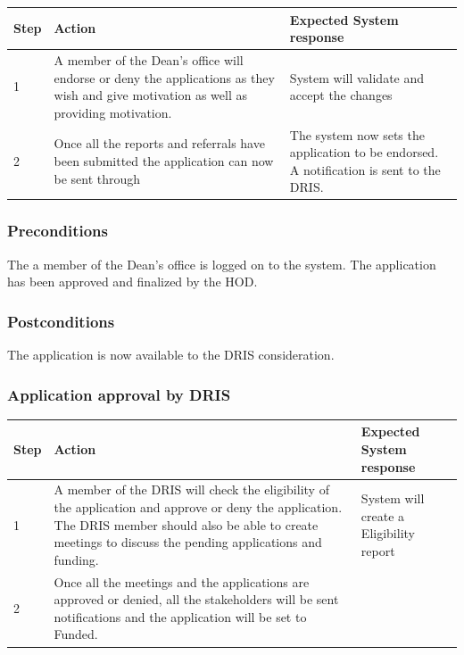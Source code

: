 \documentclass[12pt]{article}
\begin{document}
\begin{center}
\begin{tabular}{|l|p{6cm}|p{8cm}|}
\hline
Step & Action & Expected System response \\
\hline
1 & A member of the Dean's office will endorse or deny the applications as they wish and give motivation as well as providing motivation.  & System will validate and accept the changes\\
\hline
2 & Once all the reports and referrals have been submitted the application can now be sent through  & The system now sets the application to be endorsed. A notification is sent to the DRIS. \\
\hline
\end{tabular}
\end{center}

\subsubsection*{Preconditions}
The a member of the Dean's office is logged on to the system. The application has been approved and finalized by the HOD.

\subsubsection*{Postconditions}
The application is now available to the DRIS consideration.

\subsubsection{Application approval by DRIS}

\begin{center}
\begin{tabular}{|l|p{6cm}|p{8cm}|}
\hline
Step & Action & Expected System response \\
\hline
1 & A member of the DRIS will check the eligibility of the application and approve or deny the application. The DRIS member should also be able to create meetings to discuss the pending applications and funding. &  System will create a Eligibility report \\
\hline
2 & Once all the meetings and the applications are approved or denied, all the stakeholders will be sent notifications and the application will be set to Funded. \\
\hline
\end{tabular}
\end{center}
\end{document}
